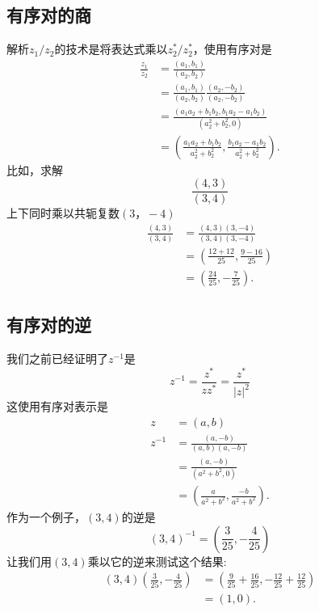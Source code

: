 \subsection{有序对的商}
解析$z_{1} / z_{2}$的技术是将表达式乘以$z_{2}^{*} / z_{2}^{*}$，使用有序对是
$$
  \begin{aligned}
    \frac{z_{1}}{z_{2}} & =\frac{\left(a_{1}, b_{1}\right)}{\left(a_{2}, b_{2}\right)}                                                             \\
                        & =\frac{\left(a_{1}, b_{1}\right)}{\left(a_{2}, b_{2}\right)} \frac{\left(a_{2},-b_{2}\right)}{\left(a_{2},-b_{2}\right)} \\
                        & =\frac{\left(a_{1} a_{2}+b_{1} b_{2}, b_{1} a_{2}-a_{1} b_{2}\right)}{\left(a_{2}^{2}+b_{2}^{2}, 0\right)}               \\
                        & =\left(\frac{a_{1} a_{2}+b_{1} b_{2}}{a_{2}^{2}+b_{2}^{2}}, \frac{b_{1} a_{2}-a_{1} b_{2}}{a_{2}^{2}+b_{2}^{2}}\right) .
  \end{aligned}
$$
比如，求解
$$
  \frac{(4,3)}{(3,4)}
$$
上下同时乘以共轭复数$(3，-4)$
$$
  \begin{aligned}
    \frac{(4,3)}{(3,4)} & =\frac{(4,3)(3,-4)}{(3,4)(3,-4)}                \\
                        & =\left(\frac{12+12}{25}, \frac{9-16}{25}\right) \\
                        & =\left(\frac{24}{25},-\frac{7}{25}\right) .
  \end{aligned}
$$

\subsection{有序对的逆}
我们之前已经证明了$z^{-1}$是
$$
  z^{-1}=\frac{z^{*}}{z z^{*}}=\frac{z^{*}}{|z|^{2}}
$$
这使用有序对表示是
$$
  \begin{aligned}
    z      & =(a, b)                                                       \\
    z^{-1} & =\frac{(a,-b)}{(a, b)(a,-b)}                                  \\
           & =\frac{(a,-b)}{\left(a^{2}+b^{2}, 0\right)}                   \\
           & =\left(\frac{a}{a^{2}+b^{2}}, \frac{-b}{a^{2}+b^{2}}\right) .
  \end{aligned}
$$
作为一个例子，$(3,4)$的逆是
$$
  (3,4)^{-1}=\left(\frac{3}{25},-\frac{4}{25}\right)
$$
让我们用$(3,4)$乘以它的逆来测试这个结果:
$$
  \begin{aligned}
    (3,4)\left(\frac{3}{25},-\frac{4}{25}\right) & =\left(\frac{9}{25}+\frac{16}{25},-\frac{12}{25}+\frac{12}{25}\right) \\
                                                 & =(1,0) .
  \end{aligned}
$$

